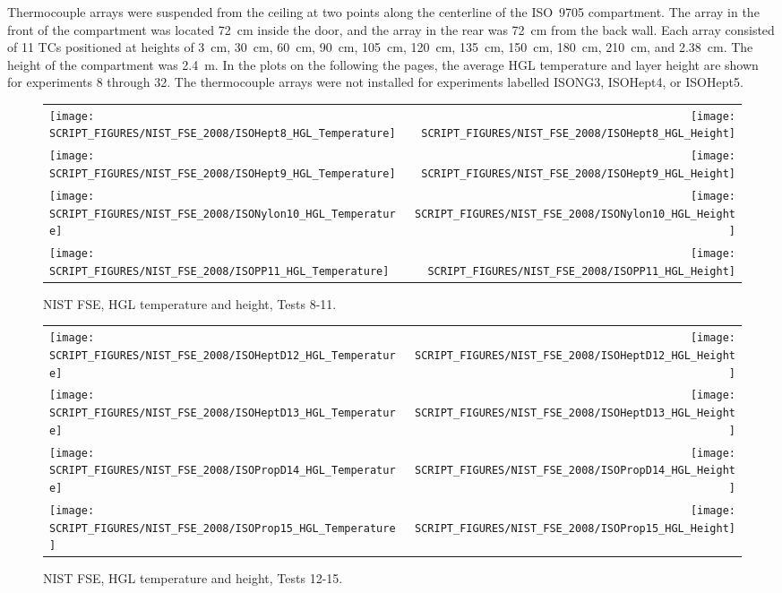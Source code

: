Thermocouple arrays were suspended from the ceiling at two points along the centerline of the ISO~9705 compartment. The array in the front of the compartment was located 72~cm inside the door, and the array in the rear was 72~cm from the back wall. Each array consisted of 11 TCs positioned at heights of 3~cm, 30~cm, 60~cm, 90~cm, 105~cm, 120~cm, 135~cm, 150~cm, 180~cm, 210~cm, and 2.38~cm. The height of the compartment was 2.4~m. In the plots on the following the pages, the average HGL temperature and layer height are shown for experiments 8 through 32. The thermocouple arrays were not installed for experiments labelled ISONG3, ISOHept4, or ISOHept5.

\newpage

\begin{figure}[p]
\begin{tabular*}{\textwidth}{l@{\extracolsep{\fill}}r}
\texttt{[image: SCRIPT\_FIGURES/NIST\_FSE\_2008/ISOHept8\_HGL\_Temperature]} &
\texttt{[image: SCRIPT\_FIGURES/NIST\_FSE\_2008/ISOHept8\_HGL\_Height]} \\
\texttt{[image: SCRIPT\_FIGURES/NIST\_FSE\_2008/ISOHept9\_HGL\_Temperature]} &
\texttt{[image: SCRIPT\_FIGURES/NIST\_FSE\_2008/ISOHept9\_HGL\_Height]} \\
\texttt{[image: SCRIPT\_FIGURES/NIST\_FSE\_2008/ISONylon10\_HGL\_Temperature]} &
\texttt{[image: SCRIPT\_FIGURES/NIST\_FSE\_2008/ISONylon10\_HGL\_Height]} \\
\texttt{[image: SCRIPT\_FIGURES/NIST\_FSE\_2008/ISOPP11\_HGL\_Temperature]} &
\texttt{[image: SCRIPT\_FIGURES/NIST\_FSE\_2008/ISOPP11\_HGL\_Height]}
\end{tabular*}
\caption[NIST FSE, HGL temperature and height, Tests 8-11]
{NIST FSE, HGL temperature and height, Tests 8-11.}
\label{NIST_FSE_2008_HGL_Temp_1}
\end{figure}

\begin{figure}[p]
\begin{tabular*}{\textwidth}{l@{\extracolsep{\fill}}r}
\texttt{[image: SCRIPT\_FIGURES/NIST\_FSE\_2008/ISOHeptD12\_HGL\_Temperature]} &
\texttt{[image: SCRIPT\_FIGURES/NIST\_FSE\_2008/ISOHeptD12\_HGL\_Height]} \\
\texttt{[image: SCRIPT\_FIGURES/NIST\_FSE\_2008/ISOHeptD13\_HGL\_Temperature]} &
\texttt{[image: SCRIPT\_FIGURES/NIST\_FSE\_2008/ISOHeptD13\_HGL\_Height]} \\
\texttt{[image: SCRIPT\_FIGURES/NIST\_FSE\_2008/ISOPropD14\_HGL\_Temperature]} &
\texttt{[image: SCRIPT\_FIGURES/NIST\_FSE\_2008/ISOPropD14\_HGL\_Height]} \\
\texttt{[image: SCRIPT\_FIGURES/NIST\_FSE\_2008/ISOProp15\_HGL\_Temperature]} &
\texttt{[image: SCRIPT\_FIGURES/NIST\_FSE\_2008/ISOProp15\_HGL\_Height]}
\end{tabular*}
\caption[NIST FSE, HGL temperature and height, Tests 12-15]
{NIST FSE, HGL temperature and height, Tests 12-15.}
\label{NIST_FSE_2008_HGL_Temp_2}
\end{figure}

